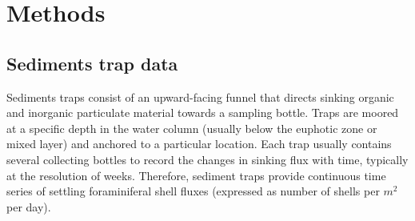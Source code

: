 \documentclass[a4paper]{article}
\begin{document}





\section{Methods}


\subsection{Sediments trap data}

Sediments traps consist of an upward-facing funnel that directs sinking organic and inorganic particulate material towards a sampling bottle. 
Traps are moored at a specific depth in the water column (usually below the euphotic zone or mixed layer) and anchored to a particular location. %
Each trap usually contains several collecting bottles to record the changes in sinking flux with time, typically at the resolution of weeks. %
Therefore, sediment traps provide continuous time series of settling foraminiferal shell fluxes (expressed as number of shells per $m^2$ per day). 
\end{document}
